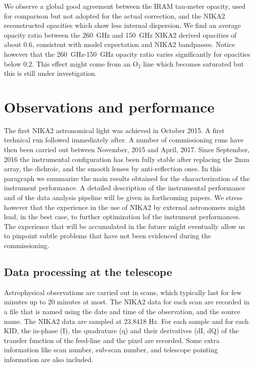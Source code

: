 \documentclass[]{aa} %
\begin{document}
We observe a global good agreement between the IRAM tau-meter opacity,
used for comparison but not adopted for the actual correction, and the
NIKA2 reconstructed opacities which show less internal dispersion. We
find an average opacity ratio between the 260~GHz and 150~GHz NIKA2
derived opacities of about 0.6, consistent with model expectation and
NIKA2 bandpasses. Notice however that the 260~GHz-150~GHz opacity
ratio varies significantly for opacities below $0.2$. This effect
might come from an O$_2$ line which becomes saturated but this is still
under investigation.

\section{Observations and performance}
\label{Observations and performance}

The first NIKA2 astronomical light was achieved in October 2015. A first technical run followed immediately after. A number of commissioning runs have then been carried out between November, 2015 and April, 2017. Since September, 2016 the instrumental configuration has been fully stable after replacing the 2mm array, the dichroic, and the smooth lenses by anti-reflection ones.
In this paragraph we summarize the main results obtained for the characterization of the instrument performance. A detailed description of the instrumental performance and of the data analysis pipeline will be given in forthcoming papers. We stress however that the experience in the use of NIKA2 by external astronomers might lead, in the best case, to further optimization lof the instrument performances. The experience that will be accumulated in the future might eventually allow us to pinpoint subtle problems that have not been evidenced during the commissioning. 

\subsection{Data processing at the telescope}
\label{Data processing at the telescope}

Astrophysical observations are carried out in scans, which typically last for few minutes up to 20 minutes at most.
The NIKA2 data for each scan are recorded in a file that is named using the date and time of the observation, and
the source name. The NIKA2 data are sampled at 23.8418 Hz. For each sample and for each KID, the in-phase (I), the quadrature
(q) and their derivatives (dI, dQ) of the transfer function of the feed-line and the pixel are recorded.
Some extra information like scan number, sub-scan number, and telescope pointing information are also included. \\
\end{document}
